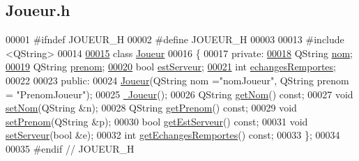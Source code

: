 \hypertarget{_joueur_8h_source}{}\subsection{Joueur.\+h}

\begin{DoxyCode}
00001 \textcolor{preprocessor}{#ifndef JOUEUR\_H}
00002 \textcolor{preprocessor}{#define JOUEUR\_H}
00003 
00013 \textcolor{preprocessor}{#include <QString>}
00014 
\hyperlink{class_joueur}{00015} \textcolor{keyword}{class }\hyperlink{class_joueur}{Joueur}
00016 \{
00017 \textcolor{keyword}{private}:
\hyperlink{class_joueur_ab06d7f1e6b482299bb03919e0cd2166d}{00018}     QString \hyperlink{class_joueur_ab06d7f1e6b482299bb03919e0cd2166d}{nom};
\hyperlink{class_joueur_a96d4237143c2e57b8025c4e116e95909}{00019}     QString \hyperlink{class_joueur_a96d4237143c2e57b8025c4e116e95909}{prenom};
\hyperlink{class_joueur_ac22161c9510ed38d6c65cdf6315737a5}{00020}     \textcolor{keywordtype}{bool} \hyperlink{class_joueur_ac22161c9510ed38d6c65cdf6315737a5}{estServeur};
\hyperlink{class_joueur_a23ab203e6bbfc1b2679a8457b99206dc}{00021}     \textcolor{keywordtype}{int} \hyperlink{class_joueur_a23ab203e6bbfc1b2679a8457b99206dc}{echangesRemportes};
00022 
00023 \textcolor{keyword}{public}:
00024     \hyperlink{class_joueur_a75f73a73741b0faa59c75fc98b872765}{Joueur}(QString nom =\textcolor{stringliteral}{"nomJoueur"}, QString prenom = \textcolor{stringliteral}{"PrenomJoueur"});
00025     \hyperlink{class_joueur_a9fb594f755601ee77ce5884c4c0861f3}{~Joueur}();
00026     QString \hyperlink{class_joueur_a1d7082ab1f926eae1bd6834e901751a7}{getNom}() \textcolor{keyword}{const};
00027     \textcolor{keywordtype}{void} \hyperlink{class_joueur_a30fdb194cbf6d7c378d173cc133fc23e}{setNom}(QString &n);
00028     QString \hyperlink{class_joueur_ade527085b285ce86ea9e369bc9959032}{getPrenom}() \textcolor{keyword}{const};
00029     \textcolor{keywordtype}{void} \hyperlink{class_joueur_a1425ea57a1f030a26d9beb1244e6caa2}{setPrenom}(QString &p);
00030     \textcolor{keywordtype}{bool} \hyperlink{class_joueur_a7bf0e45b6600ae3a68b4afdad6d884b7}{getEstServeur}() \textcolor{keyword}{const};
00031     \textcolor{keywordtype}{void} \hyperlink{class_joueur_aea42f5af160c61130d5252796378ad4f}{setServeur}(\textcolor{keywordtype}{bool} &e);
00032     \textcolor{keywordtype}{int} \hyperlink{class_joueur_affde221fc6d6bf633991fff4f11dd62b}{getEchangesRemportes}() \textcolor{keyword}{const};
00033 \};
00034 
00035 \textcolor{preprocessor}{#endif // JOUEUR\_H}
\end{DoxyCode}
